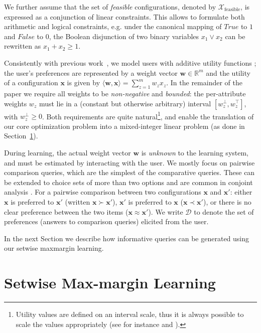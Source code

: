 \documentclass{article}
\renewcommand\[{\begin{equation}}
\renewcommand\]{\end{equation}}
\newcommand{\bbR}{\mathbb{R}}
\newcommand{\calvar}[1]{\ensuremath{\mathcal{#1}}}
\newcommand{\calD}{\calvar{D}}
\newcommand{\calX}{\calvar{X}}
\newcommand{\vecvar}[1]{\ensuremath{\boldsymbol{#1}}}
\newcommand{\vw}{\vecvar{w}}
\newcommand{\vx}{\vecvar{x}}
\begin{document}
We further assume that the set of {\em feasible} configurations, denoted by
$\calX_\text{feasible}$, is expressed as
a conjunction of linear constraints. This allows to formulate both arithmetic
and logical constraints,
e.g. under the canonical mapping of $True$ to $1$ and $False$ to $0$, the
Boolean disjunction of two binary variables $x_1 \lor x_2$ can be rewritten as
$x_1 + x_2 \ge 1$.

Consistently with previous work~\cite{guo2010real,viappiani2010optimal}, 
we model users with additive utility functions \cite{keeney1976}; 
the user's preferences are represented by a  weight
vector $\vw\in\bbR^m$ and
the utility of a configuration $\vx$ is given by
$\langle \vw, \vx \rangle = \sum_{z=1}^m w_z x_z$. 
In the remainder of the paper we
require all weights to be {\em non-negative} and {\em bounded}: the per-attribute
weights $w_z$ must lie in a (constant but otherwise arbitrary) interval
$[w^\bot_z, w^\top_z]$, with $w^\bot_z \ge 0$. 
Both requirements are quite natural\footnote{Utility values are defined on an
interval scale, thus it is always possible to scale the values appropriately (see for instance \cite{Torra2007} and \cite{keeney1976}).}, and enable the translation of our core optimization problem into a
mixed-integer linear problem (as done in Section~\ref{sec:formulation}). 

During learning, the actual weight vector $\vw$ is {\em unknown} to
the learning system, and must be estimated by interacting with the
user. We mostly focus on pairwise comparison queries, which are the
simplest of the comparative queries. These can be extended to choice
sets of more than two options
\cite{viappiani2009,viappiani2010optimal} and are common in conjoint analysis
\cite{louviere2000,toubia2004}. %
For a pairwise comparison between two configurations $\vx$ and $\vx'$:
either $\vx$ is preferred to $\vx'$ (written $\vx \succ \vx'$), $\vx'$
is preferred to $\vx$ ($\vx \prec \vx'$), or there is no clear
preference between the two items ($\vx \approx \vx'$). We write
$\calD$ to denote the set of preferences (answers to comparison
queries) elicited from the user. 

In the next Section we describe how informative queries can be generated using our setwise maxmargin learning.

\section{Setwise Max-margin Learning}
\label{sec:formulation}
\end{document}
